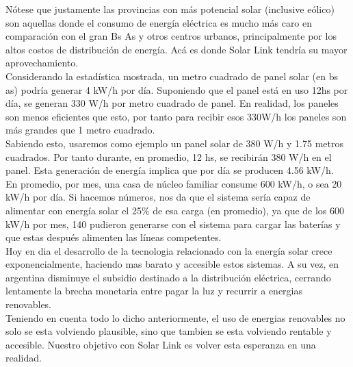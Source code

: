 Nótese que justamente las provincias con más potencial solar (inclusive eólico) son aquellas donde el consumo de energía eléctrica es mucho más caro en comparación con el gran Bs As y otros centros urbanos, principalmente por los altos costos de distribución de energía. Acá es donde Solar Link tendría su mayor aprovechamiento.\\

Considerando la estadística mostrada, un metro cuadrado de panel solar (en bs as) podría generar 4 kW/h por día. Suponiendo que el panel está en uso 12hs por día, se generan 330 W/h por metro cuadrado de panel. 
En realidad, los paneles son menos eficientes que esto, por tanto para recibir esos 330W/h los paneles son más grandes que 1 metro cuadrado. \\
Sabiendo esto, usaremos como ejemplo un panel solar de 380 W/h y 1.75 metros cuadrados. Por tanto durante, en promedio, 12 hs, se recibirán 380 W/h en el panel. Esta generación de energía implica que por día se producen 4.56 kW/h.\\

En promedio, por mes, una casa de núcleo familiar consume 600 kW/h, o sea 20 kW/h por día. Si hacemos números, nos da que el sistema sería capaz de alimentar con energía solar el 25\% de esa carga (en promedio), ya que de los 600 kW/h por mes, 140 pudieron generarse con el sistema para cargar las baterías y que estas después alimenten las líneas competentes. \\

Hoy en dia el desarrollo de la tecnologia relacionado con la energía solar crece exponencialmente, haciendo mas barato y accesible estos sistemas. A su vez, en argentina disminuye el subsidio destinado a la distribución eléctrica, cerrando lentamente la brecha monetaria entre pagar la luz y recurrir a energias renovables. \\

Teniendo en cuenta todo lo dicho anteriormente, el uso de energias renovables no solo se esta volviendo plausible, sino que tambien se esta volviendo rentable y accesible. Nuestro objetivo con Solar Link es volver esta esperanza en una realidad. \\